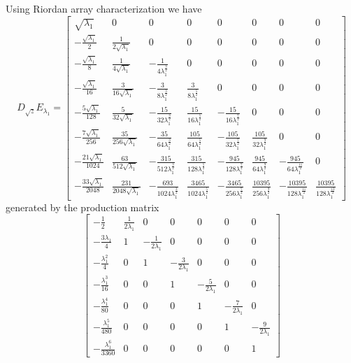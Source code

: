 \iffalse
Using Riordan array characterization we have 
\begin{displaymath}
D_{\sqrt{z}}E_{\lambda_{1}} = \left[\begin{matrix}\sqrt{\lambda_{1}} & 0 & 0 & 0 & 0 & 0 & 0 & 0\\- \frac{\sqrt{\lambda_{1}}}{2} & \frac{1}{2 \sqrt{\lambda_{1}}} & 0 & 0 & 0 & 0 & 0 & 0\\- \frac{\sqrt{\lambda_{1}}}{8} & \frac{1}{4 \sqrt{\lambda_{1}}} & - \frac{1}{4 \lambda_{1}^{\frac{3}{2}}} & 0 & 0 & 0 & 0 & 0\\- \frac{\sqrt{\lambda_{1}}}{16} & \frac{3}{16 \sqrt{\lambda_{1}}} & - \frac{3}{8 \lambda_{1}^{\frac{3}{2}}} & \frac{3}{8 \lambda_{1}^{\frac{5}{2}}} & 0 & 0 & 0 & 0\\- \frac{5 \sqrt{\lambda_{1}}}{128} & \frac{5}{32 \sqrt{\lambda_{1}}} & - \frac{15}{32 \lambda_{1}^{\frac{3}{2}}} & \frac{15}{16 \lambda_{1}^{\frac{5}{2}}} & - \frac{15}{16 \lambda_{1}^{\frac{7}{2}}} & 0 & 0 & 0\\- \frac{7 \sqrt{\lambda_{1}}}{256} & \frac{35}{256 \sqrt{\lambda_{1}}} & - \frac{35}{64 \lambda_{1}^{\frac{3}{2}}} & \frac{105}{64 \lambda_{1}^{\frac{5}{2}}} & - \frac{105}{32 \lambda_{1}^{\frac{7}{2}}} & \frac{105}{32 \lambda_{1}^{\frac{9}{2}}} & 0 & 0\\- \frac{21 \sqrt{\lambda_{1}}}{1024} & \frac{63}{512 \sqrt{\lambda_{1}}} & - \frac{315}{512 \lambda_{1}^{\frac{3}{2}}} & \frac{315}{128 \lambda_{1}^{\frac{5}{2}}} & - \frac{945}{128 \lambda_{1}^{\frac{7}{2}}} & \frac{945}{64 \lambda_{1}^{\frac{9}{2}}} & - \frac{945}{64 \lambda_{1}^{\frac{11}{2}}} & 0\\- \frac{33 \sqrt{\lambda_{1}}}{2048} & \frac{231}{2048 \sqrt{\lambda_{1}}} & - \frac{693}{1024 \lambda_{1}^{\frac{3}{2}}} & \frac{3465}{1024 \lambda_{1}^{\frac{5}{2}}} & - \frac{3465}{256 \lambda_{1}^{\frac{7}{2}}} & \frac{10395}{256 \lambda_{1}^{\frac{9}{2}}} & - \frac{10395}{128 \lambda_{1}^{\frac{11}{2}}} & \frac{10395}{128 \lambda_{1}^{\frac{13}{2}}}\end{matrix}\right]
\end{displaymath}
generated by the production matrix
\begin{displaymath}
\left[\begin{matrix}- \frac{1}{2} & \frac{1}{2 \lambda_{1}} & 0 & 0 & 0 & 0 & 0\\- \frac{3 \lambda_{1}}{4} & 1 & - \frac{1}{2 \lambda_{1}} & 0 & 0 & 0 & 0\\- \frac{\lambda_{1}^{2}}{4} & 0 & 1 & - \frac{3}{2 \lambda_{1}} & 0 & 0 & 0\\- \frac{\lambda_{1}^{3}}{16} & 0 & 0 & 1 & - \frac{5}{2 \lambda_{1}} & 0 & 0\\- \frac{\lambda_{1}^{4}}{80} & 0 & 0 & 0 & 1 & - \frac{7}{2 \lambda_{1}} & 0\\- \frac{\lambda_{1}^{5}}{480} & 0 & 0 & 0 & 0 & 1 & - \frac{9}{2 \lambda_{1}}\\- \frac{\lambda_{1}^{6}}{3360} & 0 & 0 & 0 & 0 & 0 & 1\end{matrix}\right]
\end{displaymath}
